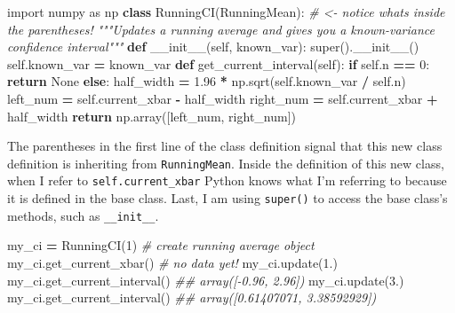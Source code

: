 \documentclass[
  12pt,
  krantz2]{krantz}
\makeatletter
\newenvironment{Shaded}{\begin{snugshade}}{\end{snugshade}}
\newcommand{\BuiltInTok}[1]{#1}
\newcommand{\CommentTok}[1]{\textcolor[rgb]{0.37,0.37,0.37}{\textit{#1}}}
\newcommand{\ControlFlowTok}[1]{\textcolor[rgb]{0.27,0.27,0.27}{\textbf{#1}}}
\newcommand{\DecValTok}[1]{\textcolor[rgb]{0.06,0.06,0.06}{#1}}
\newcommand{\FloatTok}[1]{\textcolor[rgb]{0.06,0.06,0.06}{#1}}
\newcommand{\FunctionTok}[1]{\textcolor[rgb]{0,0,0}{#1}}
\newcommand{\ImportTok}[1]{#1}
\newcommand{\KeywordTok}[1]{\textcolor[rgb]{0.27,0.27,0.27}{\textbf{#1}}}
\newcommand{\NormalTok}[1]{#1}
\newcommand{\OperatorTok}[1]{\textcolor[rgb]{0.43,0.43,0.43}{\textbf{#1}}}
\newcommand{\VariableTok}[1]{\textcolor[rgb]{0,0,0}{#1}}
\newenvironment{kframe}{%
\medskip{}
\setlength{\fboxsep}{.8em}
 \def\at@end@of@kframe{}%
 \ifinner\ifhmode%
  \def\at@end@of@kframe{\end{minipage}}%
  \begin{minipage}{\columnwidth}%
 \fi\fi%
 \def\FrameCommand##1{\hskip\@totalleftmargin \hskip-\fboxsep
 \colorbox{shadecolor}{##1}\hskip-\fboxsep
     \hskip-\linewidth \hskip-\@totalleftmargin \hskip\columnwidth}%
 \MakeFramed {\advance\hsize-\width
   \@totalleftmargin\z@ \linewidth\hsize
   \@setminipage}}%
 {\par\unskip\endMakeFramed%
 \at@end@of@kframe}
\renewenvironment{Shaded}{\begin{kframe}}{\end{kframe}}
\makeatother
\begin{document}
\begin{Shaded}
\begin{Highlighting}[]
\ImportTok{import}\NormalTok{ numpy }\ImportTok{as}\NormalTok{ np}
\KeywordTok{class}\NormalTok{ RunningCI(RunningMean): }\CommentTok{\# \textless{}{-} notice what\textquotesingle{}s inside the parentheses!}
  \CommentTok{"""Updates a running average and }
\CommentTok{  gives you a known{-}variance confidence interval"""}
  \KeywordTok{def} \FunctionTok{\_\_init\_\_}\NormalTok{(}\VariableTok{self}\NormalTok{, known\_var):}
    \BuiltInTok{super}\NormalTok{().}\FunctionTok{\_\_init\_\_}\NormalTok{()}
    \VariableTok{self}\NormalTok{.known\_var }\OperatorTok{=}\NormalTok{ known\_var}
  \KeywordTok{def}\NormalTok{ get\_current\_interval(}\VariableTok{self}\NormalTok{):}
    \ControlFlowTok{if} \VariableTok{self}\NormalTok{.n }\OperatorTok{==} \DecValTok{0}\NormalTok{:}
      \ControlFlowTok{return} \VariableTok{None}
    \ControlFlowTok{else}\NormalTok{:}
\NormalTok{      half\_width }\OperatorTok{=} \FloatTok{1.96} \OperatorTok{*}\NormalTok{ np.sqrt(}\VariableTok{self}\NormalTok{.known\_var }\OperatorTok{/} \VariableTok{self}\NormalTok{.n)  }
\NormalTok{      left\_num }\OperatorTok{=} \VariableTok{self}\NormalTok{.current\_xbar }\OperatorTok{{-}}\NormalTok{ half\_width}
\NormalTok{      right\_num }\OperatorTok{=} \VariableTok{self}\NormalTok{.current\_xbar }\OperatorTok{+}\NormalTok{ half\_width}
      \ControlFlowTok{return}\NormalTok{ np.array([left\_num, right\_num])}
\end{Highlighting}
\end{Shaded}

The parentheses in the first line of the class definition signal that this new class definition is inheriting from \texttt{RunningMean}. Inside the definition of this new class, when I refer to \texttt{self.current\_xbar} Python knows what I'm referring to because it is defined in the base class. Last, I am using \texttt{super()} to access the base class's methods, such as \texttt{\_\_init\_\_}.

\begin{Shaded}
\begin{Highlighting}[]
\NormalTok{my\_ci }\OperatorTok{=}\NormalTok{ RunningCI(}\DecValTok{1}\NormalTok{) }\CommentTok{\# create running average object}
\NormalTok{my\_ci.get\_current\_xbar() }\CommentTok{\# no data yet!}
\NormalTok{my\_ci.update(}\FloatTok{1.}\NormalTok{) }
\NormalTok{my\_ci.get\_current\_interval() }
\CommentTok{\#\# array([{-}0.96,  2.96])}
\NormalTok{my\_ci.update(}\FloatTok{3.}\NormalTok{)  }
\NormalTok{my\_ci.get\_current\_interval()  }
\CommentTok{\#\# array([0.61407071, 3.38592929])}
\end{Highlighting}
\end{Shaded}
\end{document}
